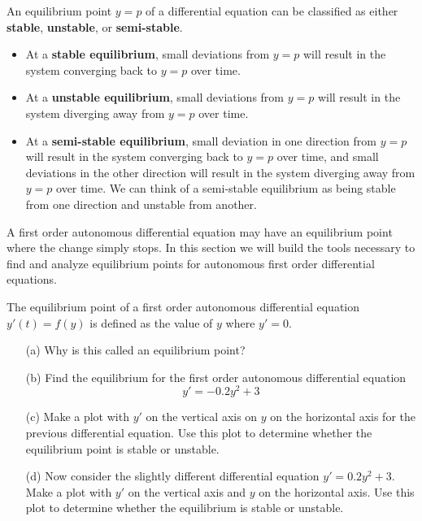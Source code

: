 \begin{definition}[Stability]
    An equilibrium point $y=p$ of a differential equation can be classified as either {\bf
    stable}, {\bf unstable}, or {\bf semi-stable}.  
    \begin{itemize}
        \item At a {\bf stable equilibrium}, small deviations from $y=p$ will result in the
            system converging back to $y=p$ over time.
        \item At a {\bf unstable equilibrium}, small deviations from $y=p$ will result in the
            system diverging away from $y=p$ over time.
        \item At a {\bf semi-stable equilibrium}, small deviation in one direction from
            $y=p$ will result in the system converging back to $y=p$ over time, and small
            deviations in the other direction will result in the system diverging away
            from $y=p$ over time.  We can think of a semi-stable equilibrium as being
            stable from one direction and unstable from another.
    \end{itemize}
\end{definition}


A first order autonomous differential equation may have an equilibrium point where the
change simply stops.  In this section we will build the tools necessary to
find and analyze equilibrium points for autonomous first order differential equations.

\begin{problem}
    The equilibrium point of a first order autonomous differential equation $y'(t) = f(y)$ is defined as
    the value of $y$ where $y'=0$.  
    \begin{itemize}
        \item[(a)] Why is this called an equilibrium point?
        \item[(b)] Find the equilibrium for the first order autonomous differential equation
            \[ y' = -0.2y^2 + 3 \]
        \item[(c)] Make a plot with $y'$ on the vertical axis on $y$ on the horizontal axis for
            the previous differential equation.  Use this plot to determine whether the
            equilibrium point is stable or unstable.
        \item[(d)] Now consider the slightly different differential equation $y' = 0.2 y^2
            + 3$.  Make a plot with $y'$ on the vertical axis and $y$ on the horizontal
            axis.  Use this plot to determine whether the equilibrium is stable or
            unstable.
    \end{itemize}
\end{problem}


